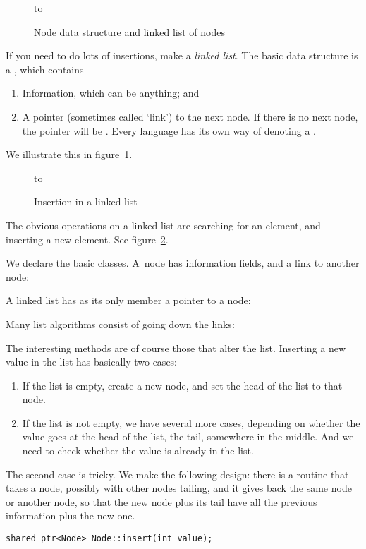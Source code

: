 \begin{figure}[ht]
\hbox to 
  \caption{Node data structure and linked list of nodes}
  \label{fig:linked-node-list}
\end{figure}

If you need to do lots of insertions, make a
\emph{linked list}. The basic data structure is a ,
which contains 
\begin{enumerate}
\item
  Information, which can be anything; and
\item A pointer (sometimes called `link') to the next node. If there
  is no next node, the pointer will be . Every language has
  its own way of denoting a .
\end{enumerate}

We illustrate this in figure~\ref{fig:linked-node-list}.

\begin{figure}[ht]
  \hbox to 
  \caption{Insertion in a linked list}
  \label{fig:linked-list-insert}
\end{figure}

The obvious operations on a linked list are searching for an element,
and inserting a new element. See figure~\ref{fig:linked-list-insert}.


We declare the basic classes. A~node has information fields, and a
link to another node:
%

A linked list has as its only member a pointer to a node:
%

Many list algorithms consist of going down the links:
%

The interesting methods are of course those that alter the
list. Inserting a new value in the list has basically two cases:
\begin{enumerate}
\item If the list is empty, create a new node, and set the head of the
  list to that node.
\item If the list is not empty, we have several more cases, depending
  on whether the value goes at the head of the list, the tail,
  somewhere in the middle. And we need to check whether the value is
  already in the list.
\end{enumerate}
The second case is tricky. We make the following design: there is a
routine that takes a node, possibly with other nodes tailing, and it
gives back the same node or another node, so that the new node plus
its tail have all the previous information plus the new one.
\begin{verbatim}
shared_ptr<Node> Node::insert(int value);
\end{verbatim}

